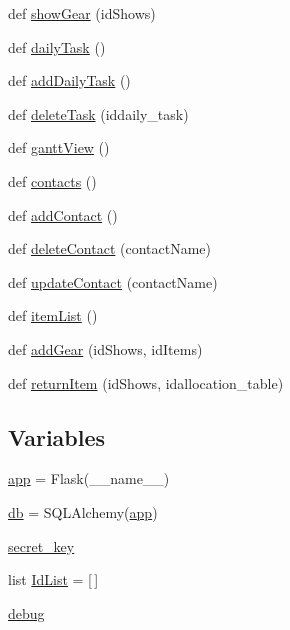 \begin{DoxyCompactItemize}
\item 
def \hyperlink{namespace_web_content_1_1app_a8a745fdd281519fdc01c26e4ebbc5f87}{show\+Gear} (id\+Shows)
\item 
def \hyperlink{namespace_web_content_1_1app_a9e50daef82abeaa1acba1829fcd2b9ae}{daily\+Task} ()
\item 
def \hyperlink{namespace_web_content_1_1app_a74ab25eca92d4f0315c1920a1101f366}{add\+Daily\+Task} ()
\item 
def \hyperlink{namespace_web_content_1_1app_af2ca8754b886a2732a45b71b8a53f185}{delete\+Task} (iddaily\+\_\+task)
\item 
def \hyperlink{namespace_web_content_1_1app_ad3f479298a258fcecb0cf0fae0c3e6de}{gantt\+View} ()
\item 
def \hyperlink{namespace_web_content_1_1app_a243cda6941738022b0168abcbe9d8e7d}{contacts} ()
\item 
def \hyperlink{namespace_web_content_1_1app_a32b908258de025be7473e15954f4683c}{add\+Contact} ()
\item 
def \hyperlink{namespace_web_content_1_1app_a8934b836311d8645b794937a4665b687}{delete\+Contact} (contact\+Name)
\item 
def \hyperlink{namespace_web_content_1_1app_a6192c461f4e0e0a2310f43f91f2724ad}{update\+Contact} (contact\+Name)
\item 
def \hyperlink{namespace_web_content_1_1app_a73068e2cc15ecd211e7fbdbe744dbcf0}{item\+List} ()
\item 
def \hyperlink{namespace_web_content_1_1app_a52178c26cbe8ed1b16427622b4dc1165}{add\+Gear} (id\+Shows, id\+Items)
\item 
def \hyperlink{namespace_web_content_1_1app_a7223fddf3b4dbcc57318bd9b85b30c5d}{return\+Item} (id\+Shows, idallocation\+\_\+table)
\end{DoxyCompactItemize}
\subsection*{Variables}
\begin{DoxyCompactItemize}
\item 
\hyperlink{namespace_web_content_1_1app_a52716e6e08bae668f90c903a1f4e2f10}{app} = Flask(\+\_\+\+\_\+name\+\_\+\+\_\+)
\item 
\hyperlink{namespace_web_content_1_1app_a317646b91bdcf24c176d3bfc065083f3}{db} = S\+Q\+L\+Alchemy(\hyperlink{namespace_web_content_1_1app_a52716e6e08bae668f90c903a1f4e2f10}{app})
\item 
\hyperlink{namespace_web_content_1_1app_a6092358451315e755637b56d42326052}{secret\+\_\+key}
\item 
list \hyperlink{namespace_web_content_1_1app_a8a9f65f156a7f89775a11e01516c5400}{Id\+List} = \mbox{[}$\,$\mbox{]}
\item 
\hyperlink{namespace_web_content_1_1app_ac91170bea34c6458f4262824618a18a2}{debug}
\end{DoxyCompactItemize}


